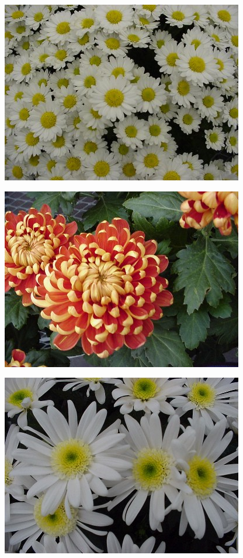 \documentclass{article}
\begin{document}
\begin{center}
\includegraphics[width=0.9\textheight, angle=90]{../Chrysanthemum_Daisy.jpg}
\end{center}
\newpage

\begin{center}
\includegraphics[width=0.9\textheight, angle=90]{../Chrysanthemum_Incurve.jpg}
\end{center}
\newpage

\begin{center}
\includegraphics[width=0.9\textheight, angle=90]{../Chrysanthemum_Mankato.jpg}
\end{center}
\newpage
\end{document}
